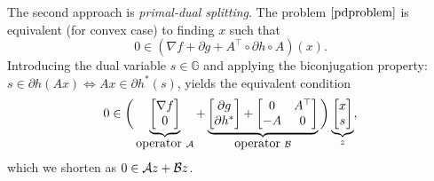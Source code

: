 {{{The second approach is \emph{primal-dual splitting}. %
}
The problem $\eqref{pdproblem}$ is equivalent (for convex case) to finding $x$ such that
\begin{equation}
0\in (\nabla f+\partial g+A^\top\circ\partial h\circ A)(x).
\end{equation}
Introducing the dual variable $s\in\mathbb{G}$ and applying the biconjugation property:  $s\in \partial h(Ax)\Leftrightarrow Ax\in \partial h^*(s)$, yields the  equivalent condition
\begin{equation}
0\in\bigg(\underbrace{\begin{bmatrix}
\nabla f\\
0
\end{bmatrix}}_{\mbox{operator}~\cA}+\underbrace{
\begin{bmatrix}
\partial g\\
\partial h^*
\end{bmatrix}+\begin{bmatrix}
0&A^\top\\
-A&0
\end{bmatrix}}_{\mbox{operator}~\cB}\bigg) \underbrace{\begin{bmatrix}
x\\
s
\end{bmatrix}}_{z},\label{pdkkt}
\end{equation}
which we shorten as $0\in{\mathcal{A}} z+{\mathcal{B}} z$.

}}
